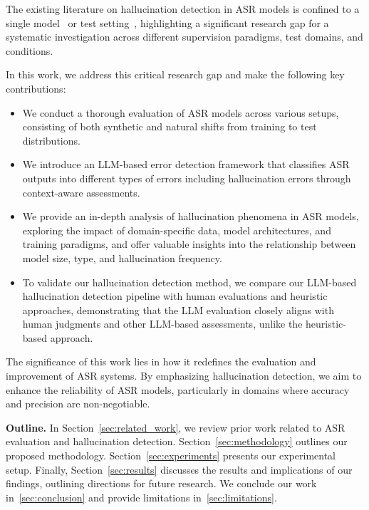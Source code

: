 The existing literature on hallucination detection in ASR models is confined to a single model~\cite{frieske2024hallucinations, serai2021hallucinationspeechrecognitionerrors, Koenecke_2024, barański2025investigationwhisperasrhallucinations, ji2023survey} or test setting~\cite{kim2024automatic}, highlighting a significant research gap for a systematic investigation across different supervision paradigms, test domains, and conditions.




In this work, we address this critical research gap and make the following key contributions:

\begin{itemize}
    \item We conduct a thorough evaluation of ASR models across various setups, consisting of both synthetic and natural shifts from training to test distributions.
    \item We introduce an LLM-based error detection framework that classifies ASR outputs into different types of errors including hallucination errors through context-aware assessments.
    \item We provide an in-depth analysis of hallucination phenomena in ASR models, exploring the impact of domain-specific data, model architectures, and training paradigms, and offer valuable insights into the relationship between model size, type, and hallucination frequency.
    \item To validate our hallucination detection method, we compare our LLM-based hallucination detection pipeline with human evaluations and heuristic approaches, demonstrating that the LLM evaluation closely aligns with human judgments and other LLM-based assessments, unlike the heuristic-based approach.
\end{itemize}


The significance of this work lies in how it redefines the evaluation and improvement of ASR systems. By emphasizing hallucination detection, we aim to enhance the reliability of ASR models, particularly in domains where accuracy and precision are non-negotiable. 


\noindent\textbf{Outline.} In Section~\ref{sec:related_work}, we review prior work related to ASR evaluation and hallucination detection. Section~\ref{sec:methodology} outlines our proposed methodology. Section~\ref{sec:experiments} presents our experimental setup. Finally, Section~\ref{sec:results} discusses the results and implications of our findings, outlining directions for future research. We conclude our work in~\ref{sec:conclusion} and provide limitations in~\ref{sec:limitations}.


